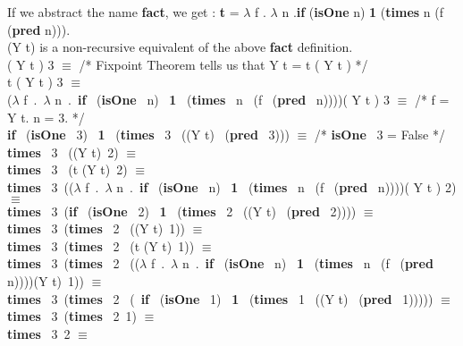 If we abstract the name \textbf{fact}, we get : \textbf{t} = $\lambda$ f . $\lambda$ n .\textbf{if} (\textbf{isOne} n) \textbf{1} (\textbf{times} n (f (\textbf{pred} n))).\\
%
(Y t)  is a non-recursive equivalent of the above \textbf{fact} definition.\\
%
\noindent
( Y t ) 3 $\equiv$ /* Fixpoint Theorem tells us that Y t = t ( Y t ) */\\
\noindent
t ( Y t ) 3 $\equiv$\\
\noindent
($\lambda$ f~.~$\lambda$ n~.~\textbf{if}~ (\textbf{isOne}~ n) ~\textbf{1}~ (\textbf{times}~ n~ (f~ (\textbf{pred}~ n))))( Y t ) 3 $\equiv$ /* f =  Y t. n = 3. */\\
\noindent
\textbf{if}~ (\textbf{isOne}~ 3) ~\textbf{1}~ (\textbf{times}~ 3~ ((Y t)~ (\textbf{pred}~ 3))) $\equiv$ /* \textbf{isOne}~ 3 = False */\\
\noindent
\textbf{times}~ 3~ ((Y t)~2) $\equiv$\\
\noindent
\textbf{times}~ 3~ (t (Y t)~2) $\equiv$\\
\noindent
\textbf{times}~ 3~(($\lambda$ f~.~$\lambda$ n~.~\textbf{if}~ (\textbf{isOne}~ n) ~\textbf{1}~ (\textbf{times}~ n~ (f~ (\textbf{pred}~ n))))( Y t ) 2) $\equiv$\\
\noindent
\textbf{times}~ 3~(\textbf{if}~ (\textbf{isOne}~ 2) ~\textbf{1}~ (\textbf{times}~ 2~ ((Y t)~ (\textbf{pred}~ 2)))) $\equiv$ \\
\noindent
\textbf{times}~ 3~(\textbf{times}~ 2~ ((Y t)~1)) $\equiv$ \\
\noindent
\textbf{times}~ 3~(\textbf{times}~ 2~ (t (Y t)~1)) $\equiv$ \\
\noindent
\textbf{times}~ 3~(\textbf{times}~ 2~ (($\lambda$ f~.~$\lambda$ n~.~\textbf{if}~ (\textbf{isOne}~ n) ~\textbf{1}~ (\textbf{times}~ n~ (f~ (\textbf{pred}~ n))))(Y t)~1)) $\equiv$ \\
\noindent
\textbf{times}~ 3~(\textbf{times}~ 2~ (~\textbf{if}~ (\textbf{isOne}~ 1) ~\textbf{1}~ (\textbf{times}~ 1~ ((Y t)~ (\textbf{pred}~ 1))))) $\equiv$ \\
\noindent
\textbf{times}~ 3~(\textbf{times}~ 2~1) $\equiv$ \\
\noindent
\textbf{times}~ 3~2 $\equiv$ \\
